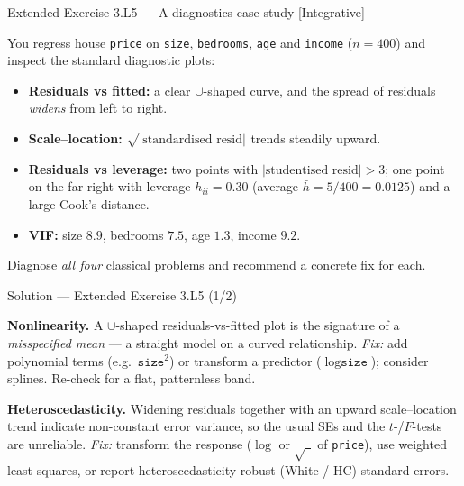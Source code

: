 \documentclass[aspectratio=169,11pt]{beamer}
\begin{document}
\begin{frame}{Extended Exercise 3.L5 --- A diagnostics case study [Integrative]}
  \begin{longexercise}
    You regress house \texttt{price} on \texttt{size}, \texttt{bedrooms},
    \texttt{age} and \texttt{income} ($n=400$) and inspect the standard
    diagnostic plots:
    \begin{itemize}
      \item \textbf{Residuals vs fitted:} a clear $\cup$-shaped curve, and
            the spread of residuals \emph{widens} from left to right.
      \item \textbf{Scale--location:} $\sqrt{|\text{standardised resid}|}$
            trends steadily upward.
      \item \textbf{Residuals vs leverage:} two points with
            $|\text{studentised resid}|>3$; one point on the far right with
            leverage $h_{ii}=0.30$ (average $\bar h=5/400=0.0125$) and a
            large Cook's distance.
      \item \textbf{VIF:} size $8.9$, bedrooms $7.5$, age $1.3$, income $9.2$.
    \end{itemize}
    Diagnose \emph{all four} classical problems and recommend a concrete
    fix for each.
  \end{longexercise}
\end{frame}

\begin{frame}{Solution --- Extended Exercise 3.L5 (1/2)}
  \begin{solutionbox}
    \textbf{Nonlinearity.} A $\cup$-shaped residuals-vs-fitted plot is
    the signature of a \emph{misspecified mean} --- a straight model on a
    curved relationship. \emph{Fix:} add polynomial terms (e.g.\
    $\texttt{size}^2$) or transform a predictor ($\log\texttt{size}$);
    consider splines. Re-check for a flat, patternless band.

    \textbf{Heteroscedasticity.} Widening residuals together with an
    upward scale--location trend indicate non-constant error variance, so
    the usual SEs and the $t$-/$F$-tests are unreliable. \emph{Fix:}
    transform the response ($\log$ or $\sqrt{\ \ }$ of \texttt{price}), use
    weighted least squares, or report heteroscedasticity-robust
    (White / HC) standard errors.
  \end{solutionbox}
\end{frame}
\end{document}

